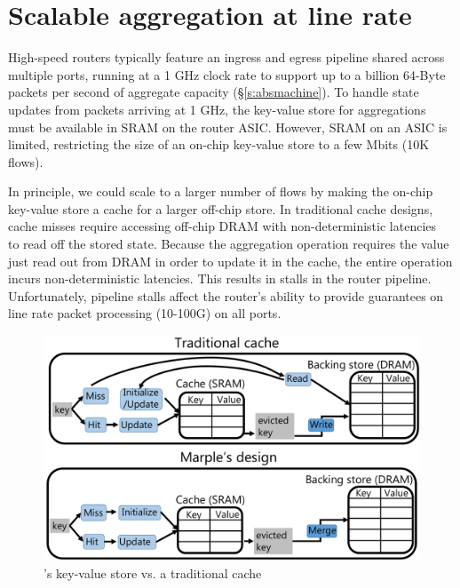\section{Scalable aggregation at line rate}
\label{sec:aggregation}
 High-speed routers typically feature an ingress and egress pipeline shared
across multiple ports, running at a 1 GHz clock rate to support up to a billion
64-Byte
packets per second of aggregate capacity (\S\ref{s:absmachine}).  To handle state updates
from packets arriving at 1 GHz, the key-value store for aggregations must be
available in SRAM on the router ASIC.  However, SRAM on an ASIC is limited,
restricting the size of an on-chip key-value store to a few Mbits (10K flows).

In principle, we could scale to a larger number of flows by making the on-chip
key-value store a cache for a larger off-chip store. In traditional cache
designs, cache misses require accessing off-chip DRAM with non-deterministic
latencies~\cite{unpredictable_cache} to read off the stored state. Because the
aggregation operation requires the value just read out from DRAM in order to update it
in the cache, the
entire operation incurs
non-deterministic latencies. This results in stalls in the router
pipeline. Unfortunately, pipeline stalls affect the router's ability to provide
guarantees on line rate packet processing (10-100G) on all ports.

\begin{figure}
\centering
\includegraphics[width=0.6\columnwidth]{pq_kv_store.pdf}
\caption{\TheSystem's key-value store vs. a traditional cache}
\label{fig:kv}
\end{figure}

